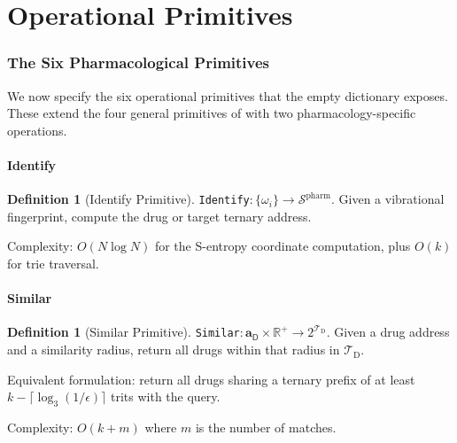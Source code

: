 \documentclass[11pt,twocolumn,a4paper]{article}
\theoremstyle{definition}
\newtheorem{definition}[theorem]{Definition}
\theoremstyle{remark}
\newcommand{\Sspace}{\mathcal{S}}
\newcommand{\Real}{\mathbb{R}}
\newcommand{\Trie}{\mathcal{T}}
\newcommand{\Dtrie}{\Trie_{\mathrm{D}}}
\newcommand{\Drug}{\mathsf{D}}
\newcommand{\drugaddr}{\mathbf{a}_\Drug}
\begin{document}
\part{Operational Primitives}

\section{The Six Pharmacological Primitives}
\label{sec:primitives}

We now specify the six operational primitives that the empty dictionary exposes. These extend the four general primitives of \citep{sachikonye2025d} with two pharmacology-specific operations.

\subsection{Identify}

\begin{definition}[Identify Primitive]
\label{def:identify_pharm}
\texttt{Identify}$: \{\omega_i\} \to \Sspace^{\mathrm{pharm}}$. Given a vibrational fingerprint, compute the drug or target ternary address.

Complexity: $O(N \log N)$ for the S-entropy coordinate computation, plus $O(k)$ for trie traversal.
\end{definition}

\subsection{Similar}

\begin{definition}[Similar Primitive]
\label{def:similar_pharm}
\texttt{Similar}$: \drugaddr \times \Real^+ \to 2^{\Dtrie}$. Given a drug address and a similarity radius, return all drugs within that radius in $\Dtrie$.

Equivalent formulation: return all drugs sharing a ternary prefix of at least $k - \lceil \log_3(1/\epsilon) \rceil$ trits with the query.

Complexity: $O(k + m)$ where $m$ is the number of matches.
\end{definition}
\end{document}
